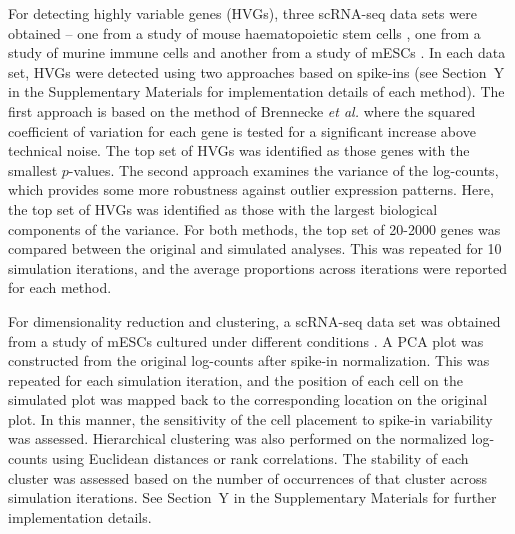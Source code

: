\documentclass{article}
\begin{document}
For detecting highly variable genes (HVGs), three scRNA-seq data sets were obtained -- one from a study of mouse haematopoietic stem cells \cite{wilson2015combined}, one from a study of murine immune cells \cite{brennecke2013accounting} and another from a study of mESCs \cite{islam2014quantitative}.
In each data set, HVGs were detected using two approaches based on spike-ins (see Section~Y in the Supplementary Materials for implementation details of each method).
The first approach is based on the method of Brennecke \textit{et al.} \cite{brennecke2013accounting} where the squared coefficient of variation for each gene is tested for a significant increase above technical noise.
The top set of HVGs was identified as those genes with the smallest $p$-values.
The second approach examines the variance of the log-counts, which provides some more robustness against outlier expression patterns.
Here, the top set of HVGs was identified as those with the largest biological components of the variance.
For both methods, the top set of 20-2000 genes was compared between the original and simulated analyses.
This was repeated for 10 simulation iterations, and the average proportions across iterations were reported for each method.

For dimensionality reduction and clustering, a scRNA-seq data set was obtained from a study of mESCs cultured under different conditions \cite{kolod2015single}.
A PCA plot was constructed from the original log-counts after spike-in normalization.
This was repeated for each simulation iteration, and the position of each cell on the simulated plot was mapped back to the corresponding location on the original plot.
In this manner, the sensitivity of the cell placement to spike-in variability was assessed.
Hierarchical clustering was also performed on the normalized log-counts using Euclidean distances or rank correlations.
The stability of each cluster was assessed based on the number of occurrences of that cluster across simulation iterations.
See Section~Y in the Supplementary Materials for further implementation details.

{\small


}
\end{document}

